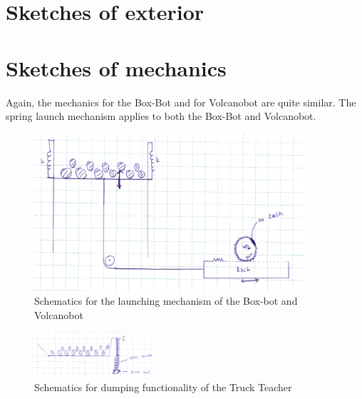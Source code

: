 \documentclass[11pt,twoside,a4paper]{report}
\begin{document}
\section{Sketches of exterior}

\section{Sketches of mechanics}
Again, the mechanics for the Box-Bot and for Volcanobot are quite similar. The spring launch mechanism applies to both the Box-Bot and Volcanobot.
\begin{figure}[h]
  \begin{center}
    \includegraphics[width=10cm]{Images/launchmechschematic.jpg}
  \end{center}
  \caption{Schematics for the launching mechanism of the Box-bot and Volcanobot}
  \label{figure:launchscheme}
\end{figure}
\begin{figure}[h]
  \begin{center}
    \includegraphics[width=0.4\textwidth]{Images/tipmechschematic.jpg}
  \end{center}
  \caption{Schematics for dumping functionality of the Truck Teacher}
  \label{figure:tipscheme}
\end{figure}
\end{document}
